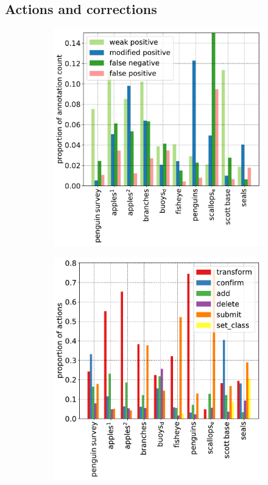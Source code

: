 \subsection {Actions and corrections}

\begin{figure}[H] 
\centering
\begin{subfigure}{0.48\linewidth}
\includegraphics[width=1.0\linewidth]{charts/summaries/correction_counts.pdf}
\caption{}
\end{subfigure}%
\begin{subfigure}{0.48\linewidth}
\includegraphics[width=1.0\linewidth]{charts/summaries/action_counts.pdf} 
\caption{}
\end{subfigure}


\end{figure}
